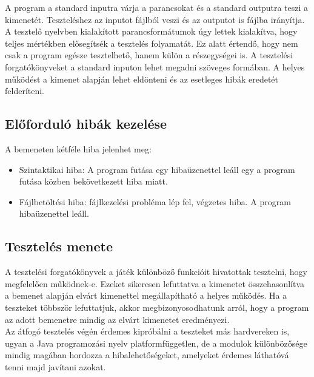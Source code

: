 
A program a standard inputra várja a parancsokat és a standard outputra teszi a kimenetét. Teszteléshez az inputot fájlból veszi és az outputot is fájlba irányítja. A tesztelő nyelvben kialakított parancsformátumok úgy lettek kialakítva, hogy teljes mértékben elősegítsék a tesztelés folyamatát. Ez alatt értendő, hogy nem csak a program egésze tesztelhető, hanem külön a részegységei is. A tesztelési forgatókönyveket a standard inputon lehet megadni szöveges formában. A helyes működést a kimenet alapján lehet eldönteni és az esetleges hibák eredetét felderíteni.

\subsection{Előforduló hibák kezelése}
A bemeneten kétféle hiba jelenhet meg:

\begin{itemize}
	
\item Szintaktikai hiba: A program futása egy hibaüzenettel leáll egy a program futása közben bekövetkezett hiba miatt.

\item Fájlbetöltési hiba: fájlkezelési probléma lép fel, végzetes hiba. A program hibaüzenettel leáll.

\end{itemize}

\subsection{Tesztelés menete}
A tesztelési forgatókönyvek a játék különböző funkcióit hivatottak tesztelni, hogy megfelelően működnek-e. Ezeket sikeresen lefuttatva a kimenetet összehasonlítva a bemenet alapján elvárt kimenettel megállapítható a helyes működés. Ha a teszteket többször lefuttatjuk, akkor megbizonyosodhatunk arról, hogy a program az adott bemenetre mindig az elvárt kimenetet eredményezi.\\
Az átfogó tesztelés végén érdemes kipróbálni a teszteket más hardvereken is, ugyan a Java programozási nyelv platformfüggetlen, de a modulok különbözősége mindig magában hordozza a hibalehetőségeket, amelyeket érdemes láthatóvá tenni majd javítani azokat. 


